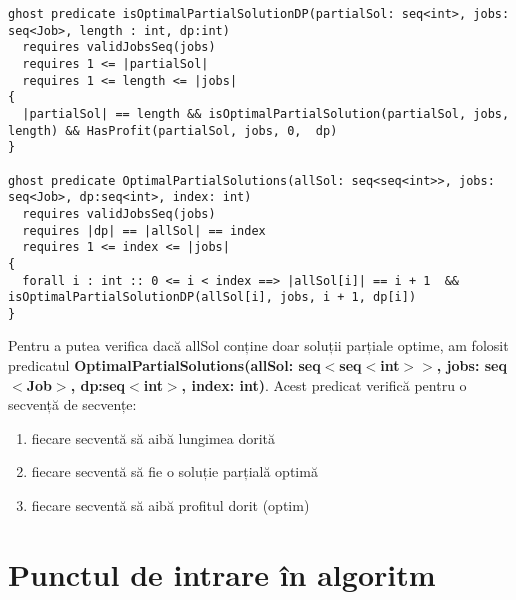 \begin{lstlisting}
ghost predicate isOptimalPartialSolutionDP(partialSol: seq<int>, jobs: seq<Job>, length : int, dp:int)
  requires validJobsSeq(jobs)
  requires 1 <= |partialSol|
  requires 1 <= length <= |jobs|
{
  |partialSol| == length && isOptimalPartialSolution(partialSol, jobs, length) && HasProfit(partialSol, jobs, 0,  dp)
}

ghost predicate OptimalPartialSolutions(allSol: seq<seq<int>>, jobs: seq<Job>, dp:seq<int>, index: int)
  requires validJobsSeq(jobs)
  requires |dp| == |allSol| == index
  requires 1 <= index <= |jobs|
{
  forall i : int :: 0 <= i < index ==> |allSol[i]| == i + 1  && isOptimalPartialSolutionDP(allSol[i], jobs, i + 1, dp[i])
}
\end{lstlisting}

Pentru a putea verifica dacă allSol conține doar soluții parțiale optime, am folosit predicatul \textbf{OptimalPartialSolutions(allSol: seq$<$seq$<$int$>$$>$, jobs: seq$<$Job$>$, dp:seq$<$int$>$, index: int)}. Acest predicat verifică pentru o secvență de secvențe:
\begin{enumerate}
    \item fiecare secventă să aibă lungimea dorită
    \item fiecare secventă să fie o soluție parțială optimă
    \item fiecare secventă să aibă profitul dorit (optim)
\end{enumerate}

\section{Punctul de intrare în algoritm}


